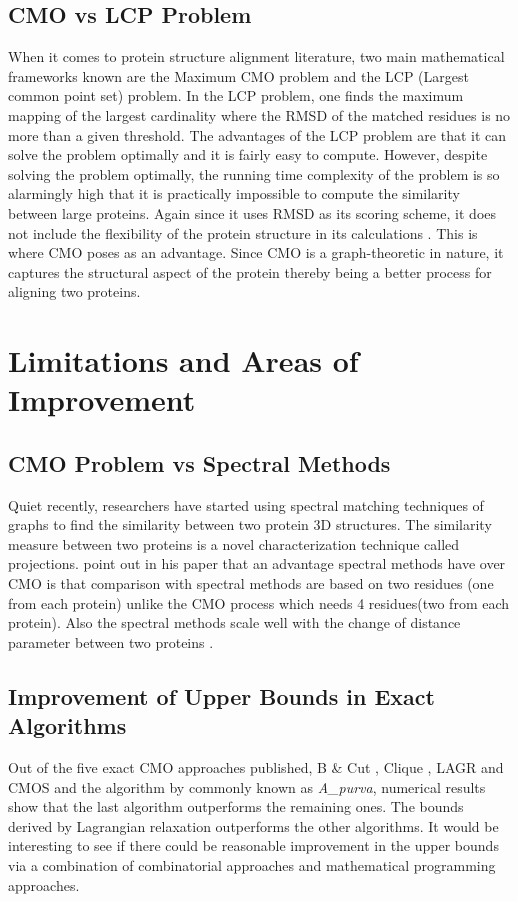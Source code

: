 \subsection{CMO vs LCP Problem}
When it comes to protein structure alignment literature, two main mathematical frameworks known are the Maximum CMO problem and the LCP (Largest common point set) problem. In the LCP problem, one finds the maximum mapping of the largest cardinality where the RMSD of the matched residues is no more than a given threshold. The advantages of the LCP problem  are that it can solve the problem optimally and it is fairly easy to compute. However, despite solving the problem optimally, the running time complexity of the problem is so alarmingly high that it is practically impossible to compute the similarity between large proteins. Again since it uses RMSD as its scoring scheme, it does not include the flexibility of the protein structure in its calculations \citep{li13}. This is where CMO poses as an advantage. Since CMO is a graph-theoretic in nature, it captures the structural aspect of the protein thereby being a better process for aligning two proteins.

\section{Limitations and Areas of Improvement}
\subsection{CMO Problem vs Spectral Methods}
Quiet recently, researchers have started using spectral matching techniques of graphs to find the similarity between two protein 3D structures. The similarity measure between two proteins is a novel characterization technique called projections. \citet{bhat06} point out in his paper that an advantage spectral methods have over CMO is that comparison with spectral methods are based on two residues (one from each protein) unlike the CMO process which needs 4 residues(two from each protein). Also the spectral methods scale well with the change of distance parameter between two proteins \citep{bhat06}.
\vspace{-0.1cm}
\subsection{Improvement of Upper Bounds in Exact Algorithms}
Out of the five exact CMO approaches published, B \& Cut \citep{carr00}, Clique \citep{strick05}, LAGR \citep{cap04} and CMOS \citep{xie07} and the algorithm by \citet{anmy11} commonly known as \emph{A\_purva}, numerical results show that the last algorithm outperforms the remaining ones. The bounds derived by Lagrangian relaxation outperforms the other algorithms. It would be interesting to see if there could be reasonable improvement in the upper bounds via a combination of combinatorial approaches and mathematical programming approaches.
\vspace{-0.1cm}
